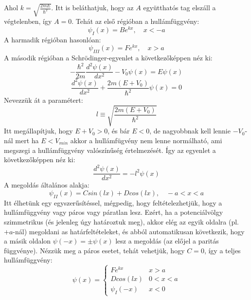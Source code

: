 \documentclass[a4paper,12pt]{article}
\begin{document}
Ahol $k = \sqrt{\frac{2mE}{\hbar^2}}$. Itt is beláthatjuk, hogy az $A$ együtthatós tag elszáll a végtelenben, így $A = 0$. Tehát az első régióban a hullámfüggvény:
\begin{equation}
    \psi_I(x) = B e^{kx}, \quad x < -a
\end{equation}
A harmadik régióban hasonlóan:
\begin{equation}
    \psi_{III}(x) = F e^{kx}, \quad x > a
\end{equation}
A második régióban a Schrödinger-egyenlet a következőképpen néz ki:
\begin{equation}
   -\frac{\hbar^2}{2m} \frac{d^2 \psi(x)}{dx^2} - V_0 \psi(x) = E \psi(x)
\end{equation}
\begin{equation}
    \frac{d^2 \psi(x)}{dx^2} + \frac{2m(E + V_0)}{\hbar^2} \psi(x) = 0
\end{equation}
Nevezzük át a paramétert:
\begin{equation}
    l \equiv \sqrt{\frac{2m(E + V_0)}{\hbar^2}}
\end{equation}
Itt megállapítjuk, hogy $E + V_0 > 0$, és bár $E < 0$, de nagyobbnak kell lennie $- V_0$-nál mert ha $E < V_{min}$ akkor a hullámfügvény nem lenne normálható, ami megszegi a hullámfüggvény valószínűség értelmezését. Így az egyenlet a következőképpen néz ki:
\begin{equation}
    \frac{d^2 \psi(x)}{dx^2} = - l^2 \psi(x)
\end{equation}
A megoldás általános alakja:
\begin{equation}
    \psi_{II}(x) = C sin(l x) + D cos(l x), \quad -a < x < a
\end{equation}
Itt élhetünk egy egyszerűsítéssel, mégpedig, hogy feltételezhetjük, hogy a hullámfüggvény vagy páros vagy páratlan lesz. Ezért, ha a potenciálvölgy szimmetrikus (és jelenleg úgy határoztuk meg),
akkor elég az egyik oldalra (pl. $+ a$-nál) megoldani as határfeltételeket, és abból automatikusan következik, hogy a másik oldalon $\psi(-x) = \pm \psi(x)$ lesz a megoldás (az előjel a paritás függvénye).
Nézzük meg a páros esetet, tehát vehetjük, hogy $C = 0$, így a teljes hullámfüggvény:
\begin{equation}
\psi(x) = \begin{cases}
    F e^{kx} & x > a \\
    D cos(l x) & 0 < x < a \\
    \psi_I(-x) & x < 0 
    \end{cases}
\end{equation}
\end{document}

